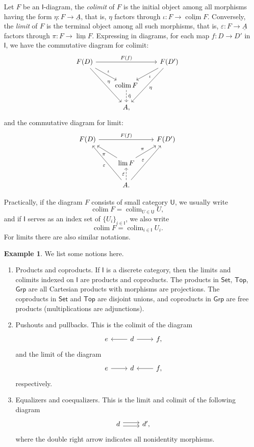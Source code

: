 \documentclass[a4paper]{amsart}
\theoremstyle{plain}
\theoremstyle{definition}
\newtheorem{eg}[thm]{Example}
\theoremstyle{remark}
\DeclareMathOperator*{\colim}{colim}
\begin{document}
Let $F$ be an $\mathsf{I}$-diagram, the \emph{colimit} of $F$ is the initial object among all morphisms having the form $\eta:F\to\underline{A}$, that is, $\eta$ factors through $\iota:F\to\underline{\colim{F}}$.
Conversely, the \emph{limit} of $F$ is the terminal object among all such morphisms, that is, $\varepsilon:F\to\underline{A}$ factors through $\pi:F\to\underline{\lim{F}}$.
Expressing in diagrams, for each map $f:D\to D'$ in $\mathsf{I}$, we have the commutative diagram for colimit:
\[\begin{tikzcd}
    F(D)\ar[rr, "{F(f)}"] \ar[dr, "\iota"] \ar[ddr, "\eta"] & & F(D') \ar[dl, "\iota"] \ar[ddl, "\eta"] \\
     & \colim{F} \ar[d, dashed, "{\tilde\eta}"] & \\
     & A, &
\end{tikzcd}\]
and the commutative diagram for limit:
\[\begin{tikzcd}
    F(D) \ar[rr, "{F(f)}"] & & F(D')\\
     & \lim{F} \ar[lu, "\pi"] \ar[ru, "\pi"] & \\
     & A. \ar[luu, "\varepsilon"] \ar[u, dashed, "{\tilde\varepsilon}"] \ar[ruu, "\varepsilon"]
\end{tikzcd}\]

Practically, if the diagram $F$ consists of small category $\mathsf{U}$, we usually write
\[\colim{F}=\colim_{U\in\mathsf{U}}U,\]
and if $\mathsf{I}$ serves as an index set of $\{U_i\}_{i\in\mathsf{I}}$, we also write
\[\colim{F}=\colim_{i\in\mathsf{I}}U_i.\]
For limits there are also similar notations.

\begin{eg}We list some notions here.
    \begin{enumerate}
        \item Products and coproducts.
        If $\mathsf{I}$ is a discrete category, then the limits and colimits indexed on $\mathsf{I}$ are products and coproducts.
        The products in $\mathsf{Set}$, $\mathsf{Top}$, $\mathsf{Grp}$ are all Cartesian products with morphisms are projections.
        The coproducts in $\mathsf{Set}$ and $\mathsf{Top}$ are disjoint unions, and coproducts in $\mathsf{Grp}$ are free products (multiplications are adjunctions).
        \item Pushouts and pullbacks.
        This is the colimit of the diagram
        \[\begin{tikzcd}
            e & d \ar[l] \ar[r] & f,
        \end{tikzcd}\]
        and the limit of the diagram
        \[\begin{tikzcd}
            e \ar[r] & d & f, \ar[l]
        \end{tikzcd}\]
        respectively.
        \item Equalizers and coequalizers.
        This is the limit and colimit of the following diagram
        \[\begin{tikzcd}
            d \ar[r, shift left] \ar[r, shift right] & d',
        \end{tikzcd}\]
        where the double right arrow indicates all nonidentity morphisms.
    \end{enumerate}
\end{eg}
\end{document}
